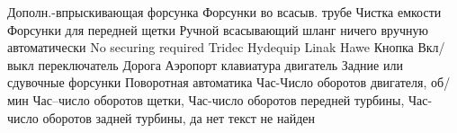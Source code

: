  {Дополн.-впрыскивающая форсунка}
 {Форсунки во всасыв. трубе}
 {Чистка емкости}
 {Форсунки для передней щетки}
 {Ручной всасывающий шланг}
 {ничего}
 {вручную}
 {автоматически}
 {\red No securing required}
 {Tridec}
 {Hydequip}
 {Linak}
 {Hawe}
 {Кнопка}
 {Вкл/выкл переключатель}
 {Дорога}
 {Аэропорт}
 {клавиатура}
 {двигатель}
 {Задние или сдувочные форсунки}
 {Поворотная автоматика}
 {Час-Число оборотов двигателя, об/мин}
 {Час--число оборотов щетки, \percent }
 {Час-число оборотов передней турбины, \percent }
 {Час-число оборотов задней турбины, \percent }
 {да}
 {нет}
 {текст не найден}

